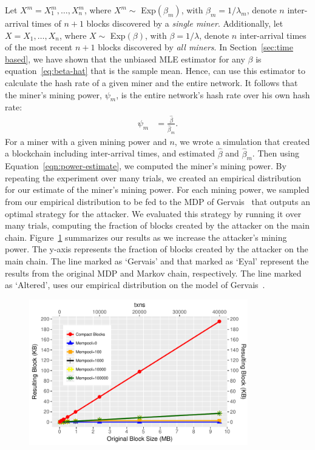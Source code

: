 Let $X^m = X_1^m, \dots, X_{n}^m$, where $X^m \sim$ Exp$(\beta_m)$, with $\beta_m = 1/\lambda_m$, denote $n$ inter-arrival times of $n+1$ blocks discovered by a {\em single miner}. Additionally, let $X = X_1, \dots, X_{n}$, where $X \sim$ Exp$(\beta)$, with $\beta = 1/\lambda$, denote $n$ inter-arrival times of the most recent $n+1$ blocks discovered by {\em all miners}.
In Section~\ref{sec:time based}, we have shown that the unbiased MLE estimator for any $\beta$ is equation~\ref{eq:beta-hat} that is the sample mean. Hence, can use this estimator to calculate the hash rate of a given miner and the entire network. It follows that the miner's mining power, $\psi_m$, is the entire network's hash rate over his own hash rate:
\begin{align}
\psi_m &= \frac{\hat{\beta}}{\hat{\beta}_m}.\label{eqn:power-estimate}
\end{align} 
 For a miner with a given mining power and $n$, we wrote a simulation that created a blockchain including inter-arrival times, and estimated $\hat{\beta}$ and $\hat{\beta}_m$. Then using Equation~\ref{eqn:power-estimate}, we computed the miner's mining power. By repeating the experiment over many trials, we created an empirical distribution for our estimate of the miner's mining power. For each mining power, we sampled from our empirical distribution to be fed to the MDP of Gervais~\cite{Gervais:2016} that outputs an optimal strategy for the attacker. We evaluated this strategy by running it over many trials, computing the fraction of blocks created by the attacker on the main chain. Figure~\ref{fig:RL} summarizes our results as we increase the attacker's mining power. The y-axis represents the fraction of blocks created by the attacker on the main chain. The line marked as `Gervais' and that marked as `Eyal' represent the results from the original MDP and Markov chain, respectively. The line marked as `Altered', uses our empirical distribution on the model of Gervais~\cite{Gervais:2016}. 

\begin{figure}\begin{center}
	\includegraphics[width=0.85\textwidth]{graphs/graphene}
	\caption{
	\label{fig:RL}}
\end{center}\end{figure}

